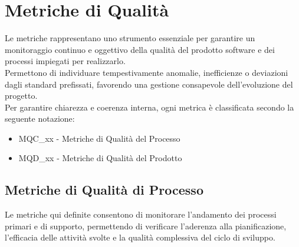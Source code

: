 \section{Metriche di Qualità}
\label{sec:metriche-qualita}
Le metriche rappresentano uno strumento essenziale per garantire un monitoraggio continuo e oggettivo della qualità del prodotto software e dei processi impiegati per realizzarlo.\\
Permettono di individuare tempestivamente anomalie, inefficienze o deviazioni dagli standard prefissati, favorendo una gestione consapevole dell’evoluzione del progetto.\\
Per garantire chiarezza e coerenza interna, ogni metrica è classificata secondo la seguente notazione:
\begin{itemize}
    \item MQC\_xx - Metriche di Qualità del Processo
    \item MQD\_xx - Metriche di Qualità del Prodotto
\end{itemize}

\subsection{Metriche di Qualità di Processo}
Le metriche qui definite consentono di monitorare l’andamento dei processi primari e di supporto, permettendo di verificare l’aderenza alla pianificazione, l’efficacia delle attività svolte e la qualità complessiva del ciclo di sviluppo.
